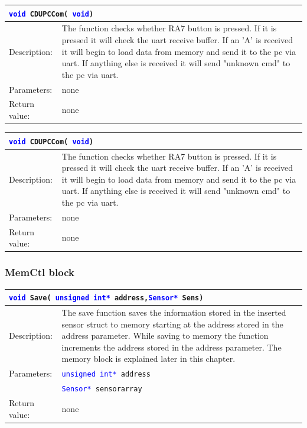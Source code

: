 \begin{table}[H]
\begin{tabular}{l p{12.5cm}}
\multicolumn{2}{l}{\texttt{\textcolor{blue}{void} CDUPCCom( \texttt{\textcolor{blue}{void}})}} \\
\hline
Description:& The function checks whether RA7 button is pressed. If it is pressed it will check the uart receive buffer. If an 'A' is received it will begin to load data from memory and send it to the pc via uart. If anything else is received it will send "unknown cmd" to the pc via uart.\\
Parameters:&none\\
Return value:&none\\
\end{tabular}
\end{table}

\begin{table}[H]
\begin{tabular}{l p{12.5cm}}
\multicolumn{2}{l}{\texttt{\textcolor{blue}{void} CDUPCCom( \texttt{\textcolor{blue}{void}})}} \\
\hline
Description:& The function checks whether RA7 button is pressed. If it is pressed it will check the uart receive buffer. If an 'A' is received it will begin to load data from memory and send it to the pc via uart. If anything else is received it will send "unknown cmd" to the pc via uart.\\
Parameters:&none\\
Return value:&none\\
\end{tabular}
\end{table}
\subsubsection{MemCtl block}
\begin{table}[H]
\begin{tabular}{l p{12.5cm}}
\multicolumn{2}{p{15cm}}{\texttt{\textcolor{blue}{void} Save( \textcolor{blue}{unsigned int*} address,\texttt{\textcolor{blue}{Sensor*} Sens})}} \\
\hline
Description:& The save function saves the information stored in the inserted sensor struct to memory starting at the address stored in the address parameter. While saving to memory the function increments the address stored in the address parameter. The memory block is explained later in this chapter.\\
Parameters:&\texttt{\textcolor{blue}{unsigned int*} address}\\
&\texttt{\textcolor{blue}{Sensor*} sensorarray}\\
Return value:&none\\
\end{tabular}
\end{table}

